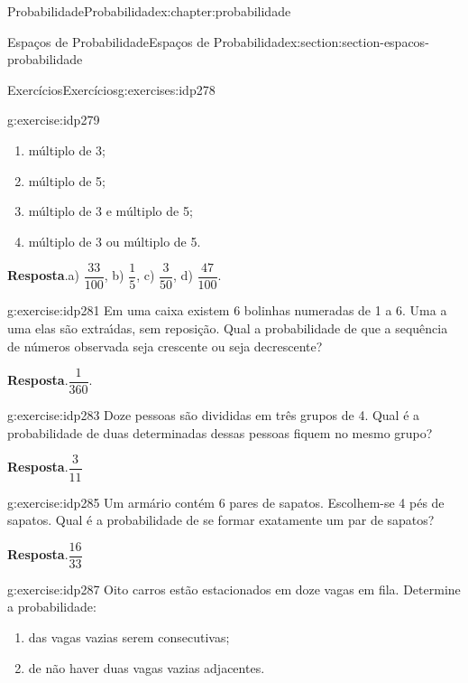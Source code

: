 \documentclass[oneside,10pt,]{book}
\newcommand{\blocktitlefont}{\relax}
\numberwithin{equation}{section}
\begin{document}
\begin{chapterptx}{Probabilidade}{}{Probabilidade}{}{}{x:chapter:probabilidade}
\begin{sectionptx}{Espaços de Probabilidade}{}{Espaços de Probabilidade}{}{}{x:section:section-espacos-probabilidade}
\begin{exercises-subsection}{Exercícios}{}{Exercícios}{}{}{g:exercises:idp278}
\begin{divisionexercise}{1}{}{}{g:exercise:idp279}
\begin{enumerate}[label=(\alph*)]
\item{}múltiplo de 3;%
\item{}múltiplo de 5;%
\item{}múltiplo de 3 e múltiplo de 5;%
\item{}múltiplo de 3 ou múltiplo de 5.%
\end{enumerate}
%
\par\smallskip%
\noindent\textbf{\blocktitlefont Resposta}.\hypertarget{g:answer:idp280}{}\quad{}a) \(\dfrac{33}{100}\), b) \(\dfrac{1}{5}\), c) \(\dfrac{3}{50}\), d) \(\dfrac{47}{100}\).%
\end{divisionexercise}%
\begin{divisionexercise}{2}{}{}{g:exercise:idp281}%
Em uma caixa existem 6 bolinhas numeradas de 1 a 6. Uma a uma elas são extraı́das, sem reposição. Qual a probabilidade de que a sequência de números observada seja crescente ou seja decrescente?%
\par\smallskip%
\noindent\textbf{\blocktitlefont Resposta}.\hypertarget{g:answer:idp282}{}\quad{}\(\dfrac{1}{360}\).%
\end{divisionexercise}%
\begin{divisionexercise}{3}{}{}{g:exercise:idp283}%
Doze pessoas são divididas em três grupos de 4. Qual é a probabilidade de duas determinadas dessas pessoas fiquem no mesmo grupo?%
\par\smallskip%
\noindent\textbf{\blocktitlefont Resposta}.\hypertarget{g:answer:idp284}{}\quad{}\(\dfrac{3}{11}\)%
\end{divisionexercise}%
\begin{divisionexercise}{4}{}{}{g:exercise:idp285}%
Um armário contém 6 pares de sapatos. Escolhem-se 4 pés de sapatos. Qual é a probabilidade de se formar exatamente um par de sapatos?%
\par\smallskip%
\noindent\textbf{\blocktitlefont Resposta}.\hypertarget{g:answer:idp286}{}\quad{}\(\dfrac{16}{33}\)%
\end{divisionexercise}%
\begin{divisionexercise}{5}{}{}{g:exercise:idp287}%
Oito carros estão estacionados em doze vagas em fila. Determine a probabilidade:%
\begin{enumerate}[label=(\alph*)]
\item{}das vagas vazias serem consecutivas;%
\item{}de não haver duas vagas vazias adjacentes.%
\end{enumerate}
%
\par\smallskip%

\end{divisionexercise}
\end{exercises-subsection}
\end{sectionptx}
\end{chapterptx}
\end{document}
